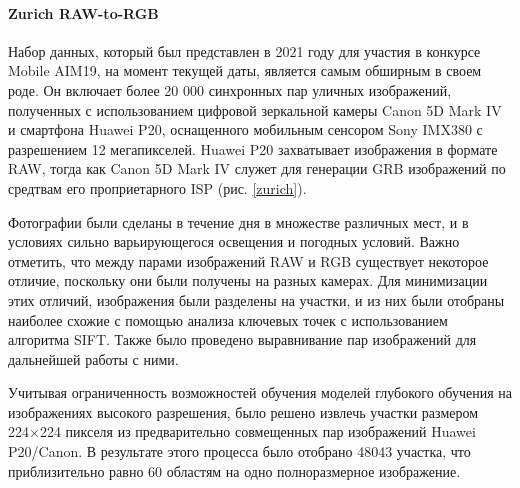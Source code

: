 \paragraph{Zurich RAW-to-RGB}

Набор данных, который был представлен в 2021 году для участия в конкурсе Mobile AIM19, на момент текущей даты, является самым обширным в своем роде. Он включает более 20 000 синхронных пар уличных изображений, полученных с использованием цифровой зеркальной камеры Canon 5D Mark IV и смартфона Huawei P20, оснащенного мобильным сенсором Sony IMX380 с разрешением 12 мегапикселей. Huawei P20 захватывает изображения в формате RAW, тогда как Canon 5D Mark IV служет для генерации GRB изображений по средтвам его проприетарного ISP (рис. \ref{zurich}).


Фотографии были сделаны в течение дня в множестве различных мест, и в условиях сильно варьирующегося освещения и погодных условий. Важно отметить, что между парами изображений RAW и RGB существует некоторое отличие, поскольку они были получены на разных камерах. Для минимизации этих отличий, изображения были разделены на участки, и из них были отобраны наиболее схожие с помощью анализа ключевых точек с использованием алгоритма SIFT. Также было проведено выравнивание пар изображений для дальнейшей работы с ними.

Учитывая ограниченность возможностей обучения моделей глубокого обучения на изображениях высокого разрешения, было решено извлечь участки размером 224×224 пикселя из предварительно совмещенных пар изображений Huawei P20/Canon. В результате этого процесса было отобрано 48043 участка, что приблизительно равно 60 областям на одно полноразмерное изображение.
